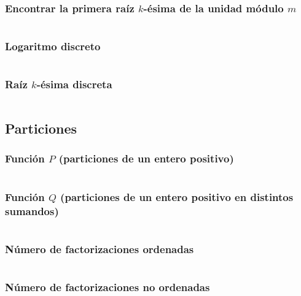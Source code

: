\documentclass[11pt]{article}
\begin{document}
			\subsubsection{Encontrar la primera raíz $k$-ésima de la unidad módulo $m$}
			\inputminted[tabsize=2,breaklines,firstline=357,lastline=373,fontsize=\small]{c++}{numberTheory.cpp}
			
			\subsubsection{Logaritmo discreto}
			\inputminted[tabsize=2,breaklines,firstline=375,lastline=398,fontsize=\small]{c++}{numberTheory.cpp}
			
			\subsubsection{Raíz $k$-ésima discreta}
			\inputminted[tabsize=2,breaklines,firstline=400,lastline=416,fontsize=\small]{c++}{numberTheory.cpp}
			
		\subsection{Particiones}
			\subsubsection{Función $P$ (particiones de un entero positivo)}
			\inputminted[tabsize=2,breaklines,firstline=519,lastline=547,fontsize=\small]{c++}{numberTheory.cpp}
			
			\subsubsection{Función $Q$ (particiones de un entero positivo en distintos sumandos)}
			\inputminted[tabsize=2,breaklines,firstline=549,lastline=596,fontsize=\small]{c++}{numberTheory.cpp}
			
			\subsubsection{Número de factorizaciones ordenadas}
			\inputminted[tabsize=2,breaklines,firstline=743,lastline=771,fontsize=\small]{c++}{numberTheory.cpp}
			
			\subsubsection{Número de factorizaciones no ordenadas}
			\inputminted[tabsize=2,breaklines,firstline=773,lastline=799,fontsize=\small]{c++}{numberTheory.cpp}
			
\end{document}
